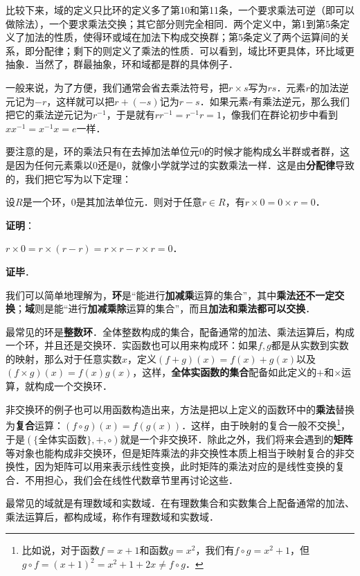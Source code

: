 比较下来，域的定义只比环的定义多了第10和第11条，一个要求乘法可逆（即可以做除法），一个要求乘法交换；其它部分则完全相同．两个定义中，第1到第5条定义了加法的性质，使得环或域在加法下构成交换群；第5条定义了两个运算间的关系，即分配律；剩下的则定义了乘法的性质．可以看到，域比环更具体，环比域更抽象．当然了，群最抽象，环和域都是群的具体例子．

一般来说，为了方便，我们通常会省去乘法符号，把$r\times s$写为$rs$．元素$r$的加法逆元记为$-r$，这样就可以把$r+(-s)$记为$r-s$．如果元素$r$有乘法逆元，那么我们把它的乘法逆元记为$r^{-1}$，于是就有$rr^{-1}=r^{-1}r=1$，像我们在群论初步中看到$xx^{-1}=x^{-1}x=e$一样．

要注意的是，环的乘法只有在去掉加法单位元$0$的时候才能构成幺半群或者群，这是因为任何元素乘以$0$还是$0$，就像小学就学过的实数乘法一样．这是由\textbf{分配律}导致的，我们把它写为以下定理：

\begin{theorem}{}
设$R$是一个环，$0$是其加法单位元．则对于任意$r\in R$，有$r\times 0=0\times r=0$．
\end{theorem}
\textbf{证明}：

$r\times 0=r\times (r-r)=r\times r-r\times r=0$．

\textbf{证毕}．



我们可以简单地理解为，\textbf{环}是“能进行\textbf{加减乘}运算的集合”，其中\textbf{乘法还不一定交换}；\textbf{域}则是能“进行\textbf{加减乘除}运算的集合”，而且\textbf{加法和乘法都可以交换}．

最常见的环是\textbf{整数环}．全体整数构成的集合，配备通常的加法、乘法运算后，构成一个环，并且还是交换环．实函数也可以用来构成环：如果$f, g$都是从实数到实数的映射，那么对于任意实数$x$，定义$(f+g)(x)=f(x)+g(x)$以及$(f\times g)(x)=f(x)g(x)$，这样，\textbf{全体实函数的集合}配备如此定义的$+$和$\times$运算，就构成一个交换环．

非交换环的例子也可以用函数构造出来，方法是把以上定义的函数环中的\textbf{乘法}替换为\textbf{复合}运算：$(f\circ g)(x)=f(g(x))$．这样，由于映射的复合一般不交换\footnote{比如说，对于函数$f=x+1$和函数$g=x^2$，我们有$f\circ g=x^2+1$，但$g\circ f=(x+1)^2=x^2+1+2x\not=f\circ g$．}，于是$(\{\text{全体实函数}\}, +, \circ)$就是一个非交换环．除此之外，我们将来会遇到的\textbf{矩阵}等对象也能构成非交换环，但是矩阵乘法的非交换性本质上相当于映射复合的非交换性，因为矩阵可以用来表示线性变换，此时矩阵的乘法对应的是线性变换的复合．不用担心，我们会在线性代数章节里再讨论这些．

最常见的域就是有理数域和实数域．在有理数集合和实数集合上配备通常的加法、乘法运算后，都构成域，称作有理数域和实数域．

